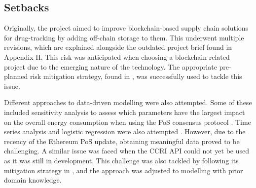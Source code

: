 \subsection{Setbacks}

Originally, the project aimed to improve blockchain-based supply chain solutions for drug-tracking by adding off-chain storage to them. This underwent multiple revisions, which are explained alongside the outdated project brief found in Appendix H. This risk was anticipated when choosing a blockchain-related project due to the emerging nature of the technology. The appropriate pre-planned risk mitigation strategy, found in , was successfully used to tackle this issue.

Different approaches to data-driven modelling were also attempted. Some of these included sensitivity analysis to assess which parameters have the largest impact on the overall energy consumption when using the PoS consensus protocol \cite{MarionAnModelling}. Time series analysis and logistic regression were also attempted \cite{IbanezTheExpansion}. However, due to the recency of the Ethereum PoS update, obtaining meaningful data proved to be challenging. A similar issue was faced when the CCRI API could not yet be used as it was still in development. This challenge was also tackled by following its mitigation strategy in , and the approach was adjusted to modelling with prior domain knowledge. 


